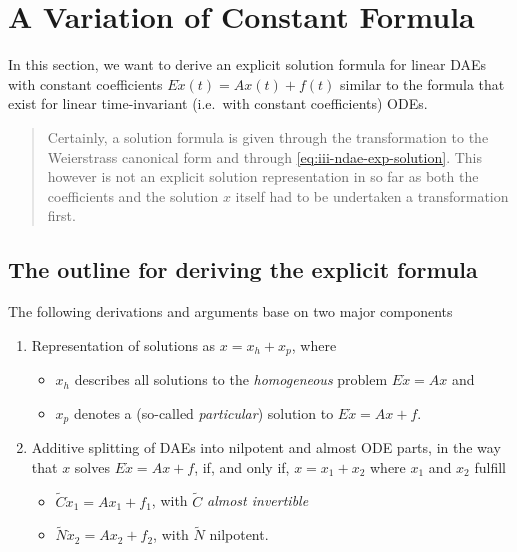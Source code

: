 \documentclass[]{book}
\providecommand{\tightlist}{%
  \setlength{\itemsep}{0pt}\setlength{\parskip}{0pt}}
\newenvironment {JHSAYS} [0] {\begin{quote}\color{jhsc}} {\end{quote}}
\theoremstyle{definition}
\theoremstyle{definition}
\theoremstyle{definition}
\theoremstyle{definition}
\theoremstyle{remark}
\begin{document}
\hypertarget{a-variation-of-constant-formula}{%
\section{A Variation of Constant Formula}\label{a-variation-of-constant-formula}}

In this section, we want to derive an explicit solution formula for linear DAEs with constant coefficients \(E\dot x(t) = Ax(t)+f(t)\) similar to the formula that exist for linear time-invariant (i.e.~with constant coefficients) ODEs.

\begin{JHSAYS}
Certainly, a solution formula is given through the transformation to the
Weierstrass canonical form and through \eqref{eq:iii-ndae-exp-solution}.
This however is not an explicit solution representation in so far as
both the coefficients and the solution \(x\) itself had to be undertaken
a transformation first.
\end{JHSAYS}

\hypertarget{the-outline-for-deriving-the-explicit-formula}{%
\subsection*{The outline for deriving the explicit formula}\label{the-outline-for-deriving-the-explicit-formula}}

The following derivations and arguments base on two major components

\begin{enumerate}
\def\labelenumi{\arabic{enumi}.}
\tightlist
\item
  Representation of solutions as \(x=x_h+x_p\), where

  \begin{itemize}
  \tightlist
  \item
    \(x_h\) describes all solutions to the \emph{homogeneous} problem \(E\dot x = Ax\) and
  \item
    \(x_p\) denotes a (so-called \emph{particular}) solution to \(E\dot x = Ax + f\).
  \end{itemize}
\item
  Additive splitting of DAEs into nilpotent and almost ODE parts, in the way that \(x\) solves \(E\dot x = Ax+f\), if, and only if, \(x=x_1+x_2\) where \(x_1\) and \(x_2\) fulfill

  \begin{itemize}
  \tightlist
  \item
    \(\tilde C \dot x_1 = A x_1 + f_1\), with \(\tilde C\) \emph{almost invertible}
  \item
    \(\tilde N \dot x_2 = A x_2 + f_2\), with \(\tilde N\) nilpotent.
  \end{itemize}
\end{enumerate}
\end{document}
